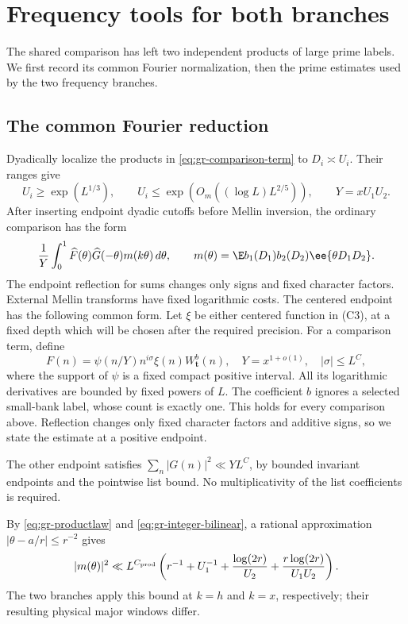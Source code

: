\section{Frequency tools for both branches}\label{sec:prime-estimates}

The shared comparison has left two independent products of large
prime labels. We first record its common Fourier normalization, then
the prime estimates used by the two frequency branches.

\subsection{The common Fourier reduction}

Dyadically localize the products in
\eqref{eq:gr-comparison-term} to \(D_i\asymp U_i\). Their ranges give
\[
 U_i\ge\exp(L^{1/3}),\qquad
 U_i\le\exp(O_m((\log L)L^{2/5})),\qquad Y=xU_1U_2.
\]
After inserting endpoint dyadic cutoffs before Mellin inversion, the
ordinary comparison has the form
\begin{equation}\label{eq:gr-fouriercomparison}
 \frac1Y\int_0^1\widehat F(\theta)\widehat G(-\theta)
                           m(k\theta)\,d\theta,\qquad
 m(\theta)=\E b_1(D_1)b_2(D_2)\ee{\theta D_1D_2}.
\end{equation}
The endpoint reflection for sums changes only signs and fixed character
factors. External Mellin transforms have fixed logarithmic costs.
The centered endpoint has the following common form.
Let \(\xi\) be either centered function in \textup{(C3)}, at a
fixed depth which will be chosen after the required precision.
For a comparison term, define
\begin{equation}
 F(n)=\psi(n/Y)n^{i\sigma}\xi(n)W_{\mathbf t}^b(n),
 \quad Y=x^{1+o(1)},\quad |\sigma|\le L^C,             \label{eq:gr-energy-F}
\end{equation}
where the support of \(\psi\) is a fixed compact positive interval.
All its logarithmic derivatives are bounded by fixed powers of \(L\).
The coefficient \(b\) ignores a selected small-bank label, whose count
is exactly one.  This holds for every comparison above.
Reflection changes only fixed character factors and additive signs,
so we state the estimate at a positive endpoint.


The other endpoint satisfies \(\sum_n|G(n)|^2\ll YL^C\), by
bounded invariant endpoints and the pointwise list bound. No
multiplicativity of the list coefficients is required.

By \eqref{eq:gr-productlaw} and
\eqref{eq:gr-integer-bilinear}, a rational approximation
\(|\theta-a/r|\le r^{-2}\) gives
\begin{equation}\label{eq:gr-multiplier}
 |m(\theta)|^2\ll L^{C_{\rm prod}}
 \left(r^{-1}+U_1^{-1}+\frac{\log(2r)}{U_2}
                    +\frac{r\log(2r)}{U_1U_2}\right).
\end{equation}
The two branches apply this bound at \(k=h\) and \(k=x\),
respectively; their resulting physical major windows differ.

